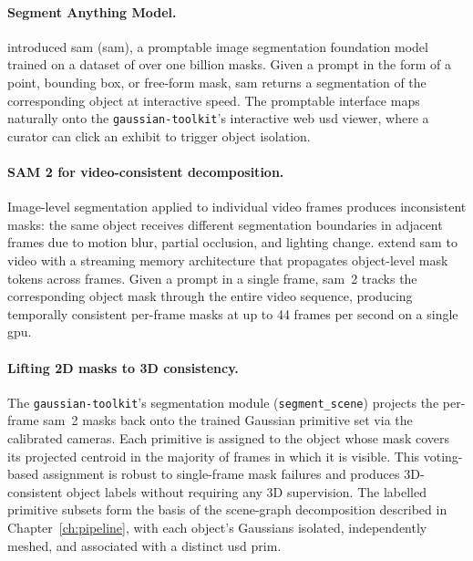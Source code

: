 \paragraph{Segment Anything Model.}
\textcite{Kirillov2023} introduced \acrlong{sam} (\acrshort{sam}), a promptable
image segmentation foundation model trained on a dataset of over one billion masks.
Given a prompt in the form of a point, bounding box, or free-form mask, \acrshort{sam}
returns a segmentation of the corresponding object at interactive speed. The
promptable interface maps naturally onto the \texttt{gaussian-toolkit}'s interactive
web \acrshort{usd} viewer, where a curator can click an exhibit to trigger object
isolation.

\paragraph{SAM 2 for video-consistent decomposition.}
Image-level segmentation applied to individual video frames produces inconsistent
masks: the same object receives different segmentation boundaries in adjacent frames
due to motion blur, partial occlusion, and lighting change. \textcite{Ravi2024SAM2}
extend \acrshort{sam} to video with a streaming memory architecture that propagates
object-level mask tokens across frames. Given a prompt in a single frame,
\acrshort{sam}~2 tracks the corresponding object mask through the entire video
sequence, producing temporally consistent per-frame masks at up to 44 frames per
second on a single \acrshort{gpu}.

\paragraph{Lifting 2D masks to 3D consistency.}
The \texttt{gaussian-toolkit}'s segmentation module (\texttt{segment\_scene})
projects the per-frame \acrshort{sam}~2 masks back onto the trained Gaussian
primitive set via the calibrated cameras. Each primitive is assigned to the object
whose mask covers its projected centroid in the majority of frames in which it
is visible. This voting-based assignment is robust to single-frame mask failures
and produces 3D-consistent object labels without requiring any 3D supervision.
The labelled primitive subsets form the basis of the scene-graph decomposition
described in Chapter~\ref{ch:pipeline}, with each object's Gaussians isolated,
independently meshed, and associated with a distinct \acrshort{usd} prim.

